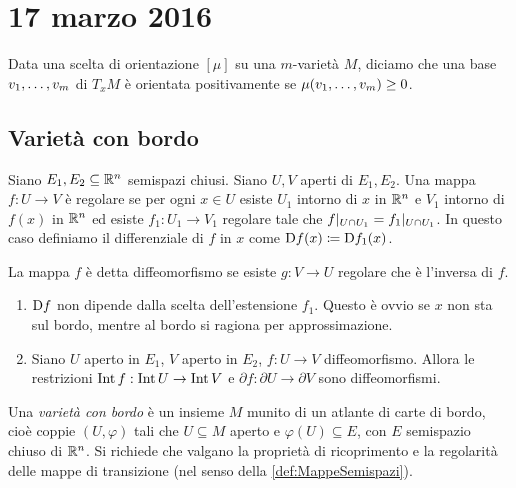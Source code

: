 \chapter{17 marzo 2016}

\begin{remark}
	Data una scelta di orientazione $[\mu]$ su una $m$-varietà $M$, diciamo che una base $\seqb vm,$ di $T_xM$ è orientata positivamente se $\mu(\seqb vm,)\ge 0$.
\end{remark}


\section{Varietà con bordo}

\begin{definition} \label{def:MappeSemispazi}
	Siano $E_1,E_2\subseteq \R^n$ semispazi chiusi. Siano $U,V$ aperti di $E_1,E_2$. Una mappa $f:U\to V$ è regolare se per ogni $x\in U$ esiste $U_1$ intorno di $x$ in $\R^n$ e $V_1$ intorno di $f(x)$ in $\R^n$ ed esiste $f_1:U_1\to V_1$ regolare tale che $f\restrict{U\cap U_1} = f_1\restrict{U\cap U_1}$.
	In questo caso definiamo il differenziale di $f$ in $x$ come $\Diff f(x) \coloneqq \Diff f_1(x)$.
	
	La mappa $f$ è detta diffeomorfismo se esiste $g:V\to U$ regolare che è l'inversa di $f$.
\end{definition}

\begin{remark}
	\begin{enumerate}
		\item $\Diff f$ non dipende dalla scelta dell'estensione $f_1$. Questo è ovvio se $x$ non sta sul bordo, mentre al bordo si ragiona per approssimazione.
		
		\item Siano $U$ aperto in $E_1$, $V$ aperto in $E_2$, $f:U \to V$ diffeomorfismo. Allora le restrizioni $\Int f:\Int U \to \Int V$ e $\partial f: \partial U \to \partial V$ sono diffeomorfismi.
	\end{enumerate}
\end{remark}

\begin{definition} 
	Una \emph{varietà con bordo} è un insieme $M$ munito di un atlante di carte di bordo, cioè coppie $(U,\varphi)$ tali che $U\subseteq M$ aperto e $\varphi(U)\subseteq E$, con $E$ semispazio chiuso di $\R^n$. Si richiede che valgano la proprietà di ricoprimento e la regolarità delle mappe di transizione (nel senso della \cref{def:MappeSemispazi}).
\end{definition}

